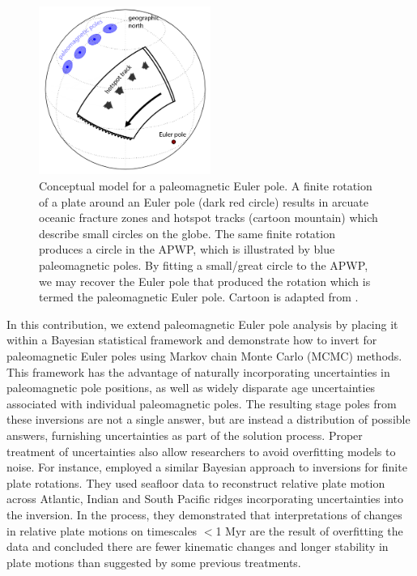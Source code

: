 \documentclass[]{agujournal2019}
\begin{document}
\begin{figure}
\centering
\includegraphics[width=0.5\textwidth]{fig_PEP_annotated.png}
\caption{Conceptual model for a paleomagnetic Euler pole. A finite rotation of a plate around an Euler pole (dark red circle) results in arcuate oceanic fracture zones and hotspot tracks (cartoon mountain) which describe small circles on the globe. The same finite rotation produces a circle in the APWP, which is illustrated by blue paleomagnetic poles. By fitting a small/great circle to the APWP, we may recover the Euler pole that produced the rotation which is termed the paleomagnetic Euler pole. Cartoon is adapted from .}
\label{fig:pep}
\end{figure}

In this contribution, we extend paleomagnetic Euler pole analysis by placing it within a Bayesian statistical framework and demonstrate how to invert for paleomagnetic Euler poles using Markov chain Monte Carlo (MCMC) methods. This framework has the advantage of naturally incorporating uncertainties in paleomagnetic pole positions, as well as widely disparate age uncertainties associated with individual paleomagnetic poles. The resulting stage poles from these inversions are not a single answer, but are instead a distribution of possible answers, furnishing uncertainties as part of the solution process. Proper treatment of uncertainties also allow researchers to avoid overfitting models to noise. For instance,  employed a similar Bayesian approach to inversions for finite plate rotations. They used seafloor data to reconstruct relative plate motion across Atlantic, Indian and South Pacific ridges incorporating uncertainties into the inversion. In the process, they demonstrated that interpretations of changes in relative plate motions on timescales $<$1 Myr are the result of overfitting the data and concluded there are fewer kinematic changes and longer stability in plate motions than suggested by some previous treatments.
\end{document}
